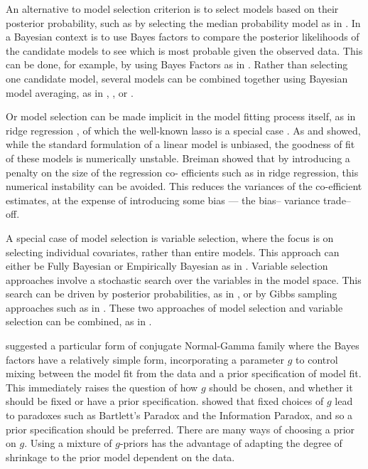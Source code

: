 \documentclass{amsart}[12pt]
\begin{document}
An alternative to model selection criterion is to select models based on their posterior probability, such as
by selecting the median probability model as in \citep{Barbieri2004}. In a Bayesian context is to use Bayes
factors to compare the posterior likelihoods of the candidate models to see which is most probable given the
observed data. This can be done, for example, by using Bayes Factors as in \citep{Kass1993}. Rather than
selecting one candidate model, several models can be combined together using Bayesian model  averaging, as in
\citep{Hoeting1999}, \citep{Raftery1997}, \citep{Fernandez2001} or \citep{Papaspiliopoulos2016}.

Or model selection can be made implicit in the model fitting process itself, as in ridge regression
\citep{Casella1980}, of which the well-known lasso is a special case \citep{Tibshirani1996}. As
\citep{Breiman1996} and \citep{Efron2013} showed, while  the standard formulation of a linear model is
unbiased, the goodness of fit of these models is numerically  unstable. Breiman showed that by introducing a
penalty on the size of the regression co- efficients such as  in ridge regression, this numerical instability
can be avoided. This reduces the variances of the co-efficient estimates, at the expense of introducing some
bias --- the bias-- variance trade--off.

A special case of model selection is variable selection, where the focus is on selecting individual
covariates, rather than entire models. This approach can either be Fully Bayesian or Empirically Bayesian as
in \citep{Cui2008}. Variable selection approaches involve a stochastic search over the variables in the model
space. This search can be driven by posterior probabilities, as in \citep{Casella2006}, or by Gibbs sampling
approaches such as in \citep{George1993}. These two approaches of model selection and variable selection can
be combined, as in \citep{Geweke1996}.


\citep{Zellner1980} suggested a particular form of conjugate Normal-Gamma family where the Bayes factors have a
relatively simple form, incorporating a parameter $g$ to control mixing between the model fit from the data
and a prior specification of model fit. This immediately raises the question of how $g$ should be chosen, and
whether it should be fixed or have a prior specification. \citep{Liang2008} showed that fixed choices of $g$
lead to paradoxes such as Bartlett's Paradox and the Information Paradox, and so a prior specification should
be preferred. There are many ways of choosing a prior on $g$. Using a mixture of $g$-priors has the advantage
of adapting the degree of shrinkage to the prior model dependent on the data.
\end{document}
